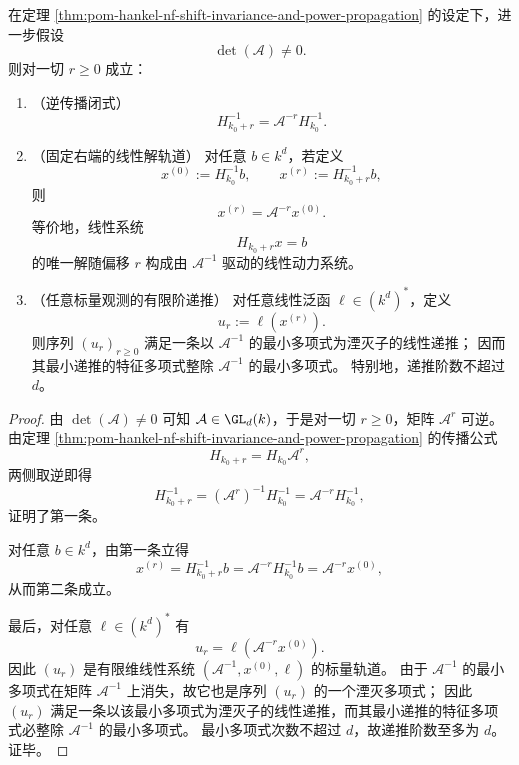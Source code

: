 \begin{theorem}\label{thm:pom-hankel-inverse-propagation-linear-orbits}
在定理 \ref{thm:pom-hankel-nf-shift-invariance-and-power-propagation} 的设定下，进一步假设
\[
\det(\mathcal A)\neq 0.
\]
则对一切 \(r\ge 0\) 成立：
\begin{enumerate}
  \item \textup{（逆传播闭式）}
  \[
  H_{k_0+r}^{-1}=\mathcal A^{-r}H_{k_0}^{-1}.
  \]
  \item \textup{（固定右端的线性解轨道）}
  对任意 \(b\in k^d\)，若定义
  \[
  x^{(0)}:=H_{k_0}^{-1}b,\qquad
  x^{(r)}:=H_{k_0+r}^{-1}b,
  \]
  则
  \[
  x^{(r)}=\mathcal A^{-r}x^{(0)}.
  \]
  等价地，线性系统
  \[
  H_{k_0+r}x=b
  \]
  的唯一解随偏移 \(r\) 构成由 \(\mathcal A^{-1}\) 驱动的线性动力系统。
  \item \textup{（任意标量观测的有限阶递推）}
  对任意线性泛函 \(\ell\in (k^d)^\ast\)，定义
  \[
  u_r:=\ell(x^{(r)}).
  \]
  则序列 \((u_r)_{r\ge 0}\) 满足一条以 \(\mathcal A^{-1}\) 的最小多项式为湮灭子的线性递推；
  因而其最小递推的特征多项式整除 \(\mathcal A^{-1}\) 的最小多项式。
  特别地，递推阶数不超过 \(d\)。
\end{enumerate}
\end{theorem}
\begin{proof}
由 \(\det(\mathcal A)\neq 0\) 可知 \(\mathcal A\in \GL_d(k)\)，于是对一切 \(r\ge 0\)，矩阵 \(\mathcal A^r\) 可逆。
由定理 \ref{thm:pom-hankel-nf-shift-invariance-and-power-propagation} 的传播公式
\[
H_{k_0+r}=H_{k_0}\mathcal A^r,
\]
两侧取逆即得
\[
H_{k_0+r}^{-1}=(\mathcal A^r)^{-1}H_{k_0}^{-1}=\mathcal A^{-r}H_{k_0}^{-1},
\]
证明了第一条。

对任意 \(b\in k^d\)，由第一条立得
\[
x^{(r)}=H_{k_0+r}^{-1}b
=\mathcal A^{-r}H_{k_0}^{-1}b
=\mathcal A^{-r}x^{(0)},
\]
从而第二条成立。

最后，对任意 \(\ell\in(k^d)^\ast\) 有
\[
u_r=\ell(\mathcal A^{-r}x^{(0)}).
\]
因此 \((u_r)\) 是有限维线性系统 \((\mathcal A^{-1},x^{(0)},\ell)\) 的标量轨道。
由于 \(\mathcal A^{-1}\) 的最小多项式在矩阵 \(\mathcal A^{-1}\) 上消失，故它也是序列 \((u_r)\) 的一个湮灭多项式；
因此 \((u_r)\) 满足一条以该最小多项式为湮灭子的线性递推，而其最小递推的特征多项式必整除 \(\mathcal A^{-1}\) 的最小多项式。
最小多项式次数不超过 \(d\)，故递推阶数至多为 \(d\)。
证毕。
\end{proof}

